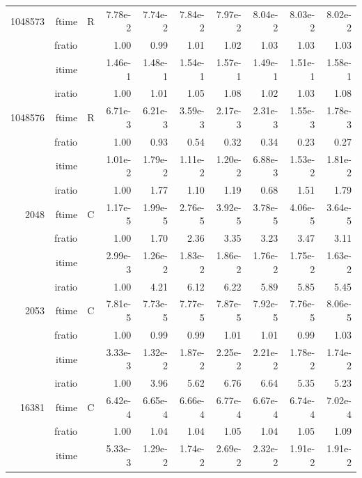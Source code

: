 \documentclass[a4paper]{article}
\begin{document}
\begin{table}
\begin{center}
\begin{tabular}{|r|r|r|r|r|r|r|r|r|r|}
  1048573  & ftime & R &    7.78e-2 &   7.74e-2 &   7.84e-2 &   7.97e-2 &   8.04e-2 &   8.03e-2 &   8.02e-2    \\ 
      & fratio & &  1.00 &   0.99 &   1.01 &   1.02 &   1.03 &   1.03 &   1.03    \\ 
     & itime & &   1.46e-1 &   1.48e-1 &   1.54e-1 &   1.57e-1 &   1.49e-1 &   1.51e-1 &   1.58e-1    \\ 
     & iratio & &   1.00 &   1.01 &   1.05 &   1.08 &   1.02 &   1.03 &   1.08    \\ \hline 
 1048576  & ftime & R &  6.71e-3 &   6.21e-3 &   3.59e-3 &   2.17e-3 &   2.31e-3 &   1.55e-3 &   1.78e-3   \\ 
      & fratio & & 1.00 &   0.93 &   0.54 &   0.32 &   0.34 &   0.23 &   0.27  \\
     & itime & & 1.01e-2 &   1.79e-2 &   1.11e-2 &   1.20e-2 &   6.88e-3 &   1.53e-2 &   1.81e-2    \\ 
 & iratio & &  1.00 &   1.77 &   1.10 &   1.19 &   0.68 &   1.51 &   1.79   \\  \hline \hline
    2048  & ftime & C  &  1.17e-5 &   1.99e-5 &   2.76e-5 &   3.92e-5 &   3.78e-5 &   4.06e-5 &   3.64e-5   \\ 
      & fratio & &  1.00 &   1.70 &   2.36 &   3.35 &   3.23 &   3.47 &   3.11   \\ 
     & itime & &  2.99e-3 &   1.26e-2 &   1.83e-2 &   1.86e-2 &   1.76e-2 &   1.75e-2 &   1.63e-2   \\ 
     & iratio & &  1.00 &   4.21 &   6.12 &   6.22 &   5.89 &   5.85 &   5.45    \\ \hline 
    2053  & ftime & C &  7.81e-5 &   7.73e-5 &   7.77e-5 &   7.87e-5 &   7.92e-5 &   7.76e-5 &   8.06e-5     \\ 
      & fratio & & 1.00 &   0.99 &   0.99 &   1.01 &   1.01 &   0.99 &   1.03    \\ 
     & itime &  & 3.33e-3 &   1.32e-2 &   1.87e-2 &   2.25e-2 &   2.21e-2 &   1.78e-2 &   1.74e-2    \\ 
    & iratio &  &    1.00 &   3.96 &   5.62 &   6.76 &   6.64 &   5.35 &   5.23     \\ \hline
  16381  & ftime & C &    6.42e-4 &   6.65e-4 &   6.66e-4 &   6.77e-4 &   6.67e-4 &   6.74e-4 &   7.02e-4     \\ 
      & fratio & & 1.00 &   1.04 &   1.04 &   1.05 &   1.04 &   1.05 &   1.09    \\ 
     & itime & &    5.33e-3 &   1.29e-2 &   1.74e-2 &   2.69e-2 &   2.32e-2 &   1.91e-2 &   1.91e-2    \\ 

\end{tabular}
\end{center}
\end{table}
\end{document}
